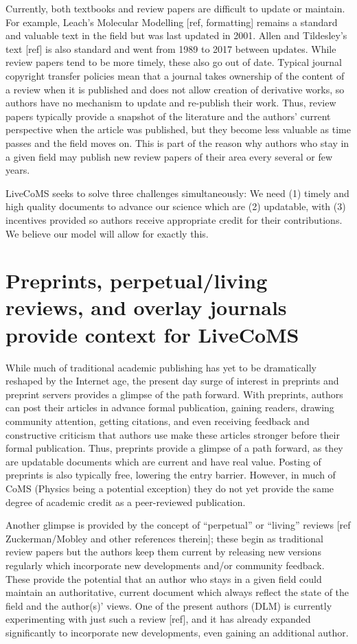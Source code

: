 \documentclass[9pt,lineno]{livecoms}
\begin{document}
Currently, both textbooks and review papers are difficult to update or maintain.
For example, Leach's Molecular Modelling [ref, formatting] remains a standard and valuable text in the field but was last updated in 2001.
Allen and Tildesley's text [ref] is also standard and went from 1989 to 2017 between updates. 
While review papers tend to be more timely, these also go out of date. 
Typical journal copyright transfer policies mean that a journal takes ownership of the content of a review when it is published and does not allow creation of derivative works, so authors have no mechanism to update and re-publish their work.
Thus, review papers typically provide a snapshot of the literature and the authors' current perspective when the article was published, but they become less valuable as time passes and the field moves on.
This is part of the reason why authors who stay in a given field may publish new review papers of their area every several or few years. 

LiveCoMS seeks to solve three challenges simultaneously: We need (1) timely and high quality documents to advance our science which are (2) updatable, with (3) incentives provided so authors receive appropriate credit for their contributions.
We believe our model will allow for exactly this. 

\section{Preprints, perpetual/living reviews, and overlay journals provide context for LiveCoMS}

While much of traditional academic publishing has yet to be dramatically reshaped by the Internet age, the present day surge of interest in preprints and preprint servers provides a glimpse of the path forward.
With preprints, authors can post their articles in advance formal publication, gaining readers, drawing community attention, getting citations, and even receiving feedback and constructive criticism that authors use make these articles stronger before their formal publication.
Thus, preprints provide a glimpse of a path forward, as they are updatable documents which are current and have real value.
Posting of preprints is also typically free, lowering the entry barrier. 
However, in much of CoMS (Physics being a potential exception) they do not yet provide the same degree of academic credit as a peer-reviewed publication. 

Another glimpse is provided by the concept of ``perpetual'' or ``living'' reviews [ref Zuckerman/Mobley and other references therein]; these begin as traditional review papers but the authors keep them current by releasing new versions regularly which incorporate new developments and/or community feedback.
These provide the potential that an author who stays in a given field could maintain an authoritative, current document which always reflect the state of the field and the author(s)' views. 
One of the present authors (DLM) is currently experimenting with just such a review [ref], and it has already expanded significantly to incorporate new developments, even gaining an additional author.
\end{document}

